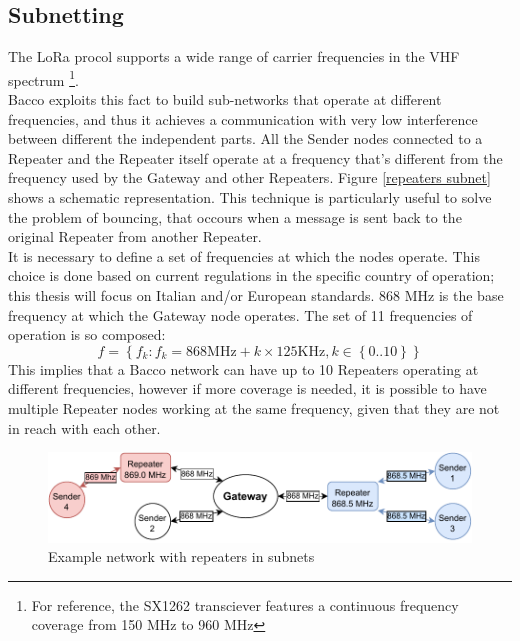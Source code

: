 \subsection{Subnetting}
The LoRa procol supports a wide range of carrier frequencies in the \gls{VHF} spectrum \footnote{For reference, the
SX1262\cite{sx1262} transciever features a continuous frequency coverage from 150 MHz to 960 MHz}.\\
Bacco exploits this fact to build sub-networks that operate at different frequencies, and thus it achieves a communication with very low
interference between different the independent parts. All the Sender nodes connected to a Repeater and the Repeater
itself operate at a frequency that's different from the frequency used by the Gateway and other Repeaters. Figure \ref{repeaters
subnet} shows a schematic representation. This technique is particularly useful to solve the problem of bouncing, that occours
when a message is sent back to the original Repeater from another Repeater.\\
It is necessary to define a set of frequencies at which the nodes operate. This choice is done
based on current regulations in the specific country of operation; this thesis will focus on Italian and/or European
standards. 868 MHz is the base frequency at which the Gateway node operates. The set of 11 frequencies of operation
is so composed:
\begin{equation}
\label{set of frequencies}
f = \left\{ f_k : f_k = 868\text{MHz} + k \times 125\text{KHz}, k\in \left\{0..10 \right\} \right\}
\end{equation}
This implies that a Bacco network can have up to 10 Repeaters operating at different frequencies, however if more coverage
is needed, it is possible to have multiple Repeater nodes working at the same frequency, given that they are not in
reach with each other.


\begin{figure}[h]
    \centering
    \includegraphics[width=\linewidth]{uml/repeaters_subnet.pdf}
    \caption{Example network with repeaters in subnets}
    \label{repeaters subnet}
\end{figure}


